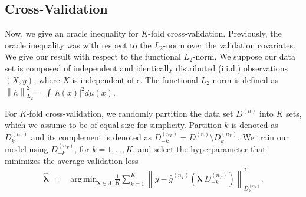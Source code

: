 \documentclass[12pt]{article} %
\theoremstyle{definition}
\DeclareMathOperator*{\argmin}{arg\,min}
\begin{document}
\subsection{Cross-Validation}\label{sec:cv}

Now, we give an oracle inequality for $K$-fold cross-validation.
Previously, the oracle inequality was with respect to the $L_2$-norm over the validation covariates.
We give our result with respect to the functional $L_2$-norm.
We suppose our data set is composed of independent and identically distributed (i.i.d.) observations $(X,y)$, where $X$ is independent of $\epsilon$.
The functional $L_2$-norm is defined as
$
\left \| h \right \|^2_{L_2} = \int \left |h(x) \right |^2 d\mu(x)
$.

For $K$-fold cross-validation, we randomly partition the data set $D^{(n)}$ into $K$ sets, which we assume to be of equal size for simplicity. Partition $k$ is denoted as $D_k^{(n_V)}$ and its complement is denoted as $D_{-k}^{(n_T)} = D^{(n)} \setminus D_k^{(n_V)}$. We train our model using $D_{-k}^{(n_T)}$, for $k=1,...,K$, and select the hyperparameter that minimizes the average validation loss
\begin{eqnarray}
\label{kfold_opt}
\hat{\boldsymbol \lambda} &=& \argmin_{\boldsymbol{\lambda} \in\Lambda} \frac{1}{K} \sum_{k=1}^K  \left \| y-\hat{g}^{(n_T)}(\boldsymbol \lambda | D_{-k}^{(n_T)}) \right \|_{D_k^{(n_V)}}^{2}.
\end{eqnarray}
\end{document}
